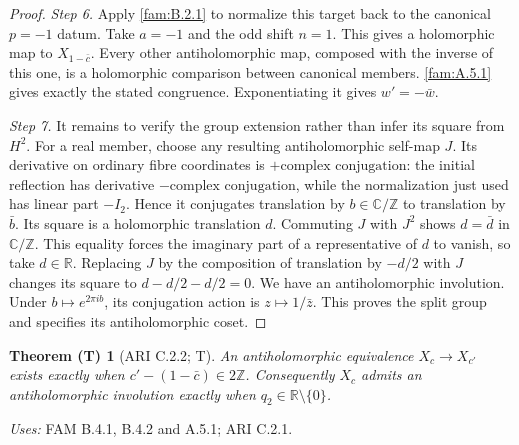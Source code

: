 \documentclass[11pt,a4paper]{article}
\theoremstyle{plain}
\newtheorem{theorem}{Theorem (T)}[section]
\theoremstyle{definition}
\begin{document}
\begin{proof}
\par\noindent\textit{Step 6.} Apply \ref{fam:B.2.1} to normalize this target back to the canonical $p=-1$ datum. Take $a=-1$ and the odd shift $n=1$. This gives a holomorphic map to $X_{1-\bar c}$. Every other antiholomorphic map, composed with the inverse of this one, is a holomorphic comparison between canonical members. \ref{fam:A.5.1} gives exactly the stated congruence. Exponentiating it gives $w'=-\bar w$.

\par\noindent\textit{Step 7.} It remains to verify the group extension rather than infer its square from $H^2$. For a real member, choose any resulting antiholomorphic self-map $J$. Its derivative on ordinary fibre coordinates is $+\text{complex conjugation}$: the initial reflection has derivative $-\text{complex conjugation}$, while the normalization just used has linear part $-I_2$. Hence it conjugates translation by $b\in\mathbb C/\mathbb Z$ to translation by $\bar b$. Its square is a holomorphic translation $d$. Commuting $J$ with $J^2$ shows $d=\bar d$ in $\mathbb C/\mathbb Z$. This equality forces the imaginary part of a representative of $d$ to vanish, so take $d\in\mathbb R$. Replacing $J$ by the composition of translation by $-d/2$ with $J$ changes its square to $d-d/2-d/2=0$. We have an antiholomorphic involution. Under $b\mapsto e^{2\pi ib}$, its conjugation action is $z\mapsto1/\bar z$. This proves the split group and specifies its antiholomorphic coset.
\end{proof}

\begin{theorem}[ARI C.2.2; T]\label{ari:C.2.2}
An antiholomorphic equivalence $X_c\to X_{c'}$ exists exactly when
$c'-(1-\bar c)\in2\mathbb Z$. Consequently $X_c$ admits an
antiholomorphic involution exactly when $q_2\in\mathbb R\setminus\{0\}$.
\end{theorem}
\noindent\emph{Uses:} FAM B.4.1, B.4.2 and A.5.1; ARI C.2.1.\par
\end{document}
